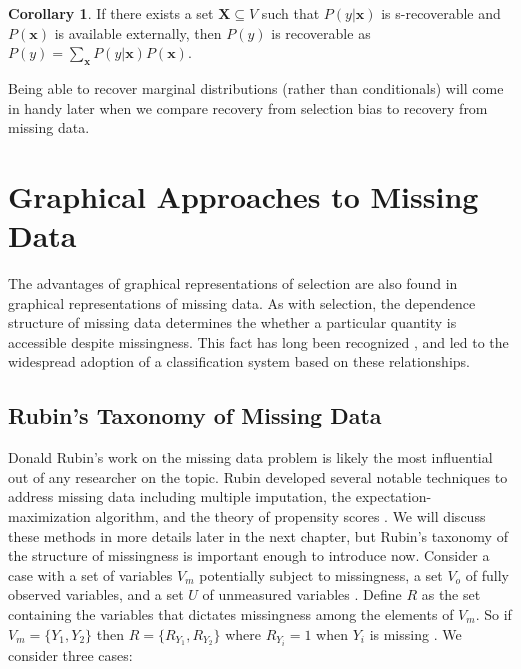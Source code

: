 \documentclass[12pt,twoside]{reedthesis}
\theoremstyle{definition}
\newtheorem{corollary}{Corollary}[section]
\begin{document}
\begin{corollary}
If there exists a set $\mathbf{X} \subseteq V$ such that $P(y|\mathbf{x})$ is s-recoverable and $P(\mathbf{x})$ is available externally, then $P(y)$ is recoverable as $P(y) = \sum_{\mathbf{x}} P(y|\mathbf{x})P(\mathbf{x})$.
\end{corollary}

Being able to recover marginal distributions (rather than conditionals) will come in handy later when we compare recovery from selection bias to recovery from missing data.

\chapter{Graphical Approaches to Missing Data}

The advantages of graphical representations of selection are also found in graphical representations of missing data. As with selection, the dependence structure of missing data determines the whether a particular quantity is accessible despite missingness. This fact has long been recognized \citep{Mohan_2019}, \citep{Little_1986} and led to the widespread adoption of a classification system based on these relationships.

\section{Rubin's Taxonomy of Missing Data}

Donald Rubin's work on the missing data problem is likely the most influential out of any researcher on the topic. Rubin developed several notable techniques to address missing data including multiple imputation, the expectation-maximization algorithm, and the theory of propensity scores \citep{Little_1986}. We will discuss these methods in more details later in the next chapter, but Rubin's taxonomy \citep{Rubin_1976} of the structure of missingness is important enough to introduce now. Consider a  case with a set of variables $V_m$ potentially subject to missingness, a set $V_o$ of  fully observed variables, and a set $U$ of unmeasured variables \citep{Mohan_2013}. Define $R$ as the set containing the variables that dictates missingness among the elements of $V_m$. So if $V_m = \{Y_1, Y_2\}$ then $R = \{R_{Y_1}, R_{Y_2}\}$ where $R_{Y_i} = 1$ when $Y_i$ is missing \citep{Mohan_2013}. We consider three cases:
\end{document}
